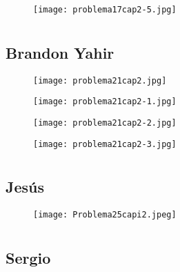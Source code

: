 \documentclass[12pt]{article}
\begin{document}
\begin{figure}[htb] 
\centering \texttt{[image: problema17cap2-5.jpg]} 
\end{figure}
\newpage

\section{ }
\subsection{{} Brandon Yahir}

\begin{figure}[htb] 
\centering \texttt{[image: problema21cap2.jpg]} 
\end{figure}
\newpage

\begin{figure}[htb] 
\centering \texttt{[image: problema21cap2-1.jpg]} 
\end{figure}
\newpage

\begin{figure}[htb] 
\centering \texttt{[image: problema21cap2-2.jpg]} 
\end{figure}
\newpage

\begin{figure}[htb] 
\centering \texttt{[image: problema21cap2-3.jpg]} 
\end{figure}
\newpage

\section{ }
\subsection{{} Jesús}

\begin{figure}[htb] 
\centering \texttt{[image: Problema25capi2.jpeg]} 
\end{figure}
\newpage


\section{ }
\subsection{{} Sergio}
\end{document}
